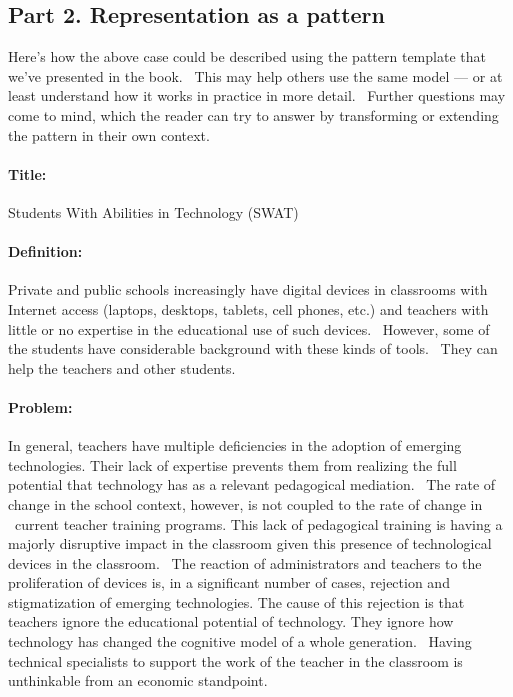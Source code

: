 \hypertarget{part-2.-representation-as-a-pattern}{%
\subsection{Part 2. Representation as a
pattern}\label{part-2.-representation-as-a-pattern}}

Here's how the above case could be described using the pattern template
that we've presented in the book. ~This may help others use the same
model --- or at least understand how it works in practice in more
detail. ~Further questions may come to mind, which the reader can try to
answer by transforming or extending the pattern in their own context.

\hypertarget{title}{%
\paragraph{Title:}\label{title}}

Students With Abilities in Technology (SWAT)

\hypertarget{definition}{%
\paragraph{Definition:}\label{definition}}

Private and public schools increasingly have digital devices in
classrooms with Internet access (laptops, desktops, tablets, cell
phones, etc.) and teachers with little or no expertise in the
educational use of such devices. ~However, some of the students have
considerable background with these kinds of tools.~ They can help the
teachers and other students.

\hypertarget{problem}{%
\paragraph{Problem:}\label{problem}}

In general, teachers have multiple deficiencies in the adoption of
emerging technologies. Their lack of expertise prevents them from
realizing the full potential that technology has as a relevant
pedagogical mediation. ~The rate of change in the school context,
however, is not coupled to the rate of change in ~current teacher
training programs. This lack of pedagogical training is having a majorly
disruptive impact in the classroom given this presence of technological
devices in the classroom. ~The reaction of administrators and teachers
to the proliferation of devices is, in a significant number of cases,
rejection and stigmatization of emerging technologies. The cause of this
rejection is that teachers ignore the educational potential of
technology. They ignore how technology has changed the cognitive model
of a whole generation. ~Having technical specialists to support the work
of the teacher in the classroom is unthinkable from an economic
standpoint.

